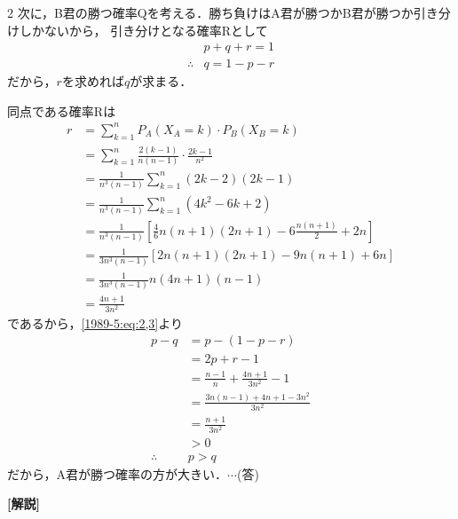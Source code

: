 \documentclass[../../../../main.tex]{subfiles}
\begin{document}
\begin{multicols}{2}
    次に，B君の勝つ確率Qを考える．勝ち負けはA君が勝つかB君が勝つか引き分けしかないから，
    引き分けとなる確率Rとして
    \begin{align}
         & p+q+r=1                        \\
        \therefore
         & q = 1 -p-r \label{1989-5:eq:3}
    \end{align}
    だから，$r$を求めれば$q$が求まる．

    同点である確率Rは
    \begin{align*}
        r
         & = \sum_{k=1}^n P_A(X_A=k) \cdot P_B(X_B=k)                                    \\
         & = \sum_{k=1}^n \frac{2(k-1)}{n(n-1)}  \cdot  \frac{2k-1}{n^2}                 \\
         & = \frac{1}{n^3(n-1)}\sum_{k=1}^n (2k-2)(2k-1)                                 \\
         & = \frac{1}{n^3(n-1)}\sum_{k=1}^n (4k^2-6k+2)                                  \\
         & = \frac{1}{n^3(n-1)}\left[\frac{4}{6}n(n+1)(2n+1)-6\frac{n(n+1)}{2}+2n\right] \\
         & = \frac{1}{3n^3(n-1)} \left[2n(n+1)(2n+1)-9n(n+1)+6n\right]                   \\
         & = \frac{1}{3n^3(n-1)} n(4n+1)(n-1)                                            \\
         & = \frac{4n+1}{3n^2}
    \end{align*}
    であるから，\cref{1989-5:eq:2,3}より
    \begin{align*}
        p-q
         & = p-(1-p-r)                            \\
         & = 2p+r-1                               \\
         & = \frac{n-1}{n} + \frac{4n+1}{3n^2} -1 \\
         & = \frac{3n(n-1)+4n+1-3n^2}{3n^2}       \\
         & = \frac{n+1}{3n^2}                     \\
         & > 0                                    \\
        \therefore
         & p > q
    \end{align*}
    だから，A君が勝つ確率の方が大きい．$\cdots$(答)

    \vspace{10pt}
    {\bf[解説]}


\end{multicols}
\end{document}
